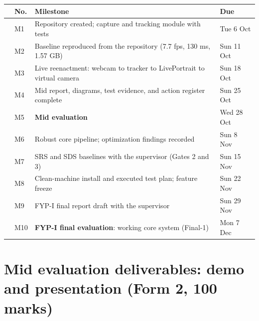 \documentclass[10pt,a4paper]{article}
\newcounter{cbn}
\newcommand{\cb}{\mbox{\stepcounter{cbn}\CheckBox[name=cb\thecbn,width=9pt,height=9pt,borderwidth=0.8pt,bordercolor=0 0 0,backgroundcolor=1 1 1,checkboxsymbol=\ding{51}]{}}}
\newcommand{\cbdone}{\mbox{\stepcounter{cbn}\CheckBox[name=cb\thecbn,checked=true,width=9pt,height=9pt,borderwidth=0.8pt,bordercolor=0 0 0,backgroundcolor=1 1 1,checkboxsymbol=\ding{51}]{}}}
\begin{document}
\begin{Form}
\begin{longtable}{@{}p{6mm}p{10mm}p{118mm}p{28mm}@{}}
\toprule
 & No. & Milestone & Due \\
\midrule
\endhead
\cbdone & M1 & Repository created; capture and tracking module with tests & Tue 6 Oct \\
\cb & M2 & Baseline reproduced from the repository (7.7 fps, 130 ms, 1.57 GB) & Sun 11 Oct \\
\cb & M3 & Live reenactment: webcam to tracker to LivePortrait to virtual camera & Sun 18 Oct \\
\cb & M4 & Mid report, diagrams, test evidence, and action register complete & Sun 25 Oct \\
\cb & M5 & \textbf{Mid evaluation} & Wed 28 Oct \\
\cb & M6 & Robust core pipeline; optimization findings recorded & Sun 8 Nov \\
\cb & M7 & SRS and SDS baselines with the supervisor (Gates 2 and 3) & Sun 15 Nov \\
\cb & M8 & Clean-machine install and executed test plan; feature freeze & Sun 22 Nov \\
\cb & M9 & FYP-I final report draft with the supervisor & Sun 29 Nov \\
\cb & M10 & \textbf{FYP-I final evaluation}: working core system (Final-1) & Mon 7 Dec \\
\bottomrule
\end{longtable}

\section*{Mid evaluation deliverables: demo and presentation (Form 2, 100 marks)}


\end{Form}
\end{document}
